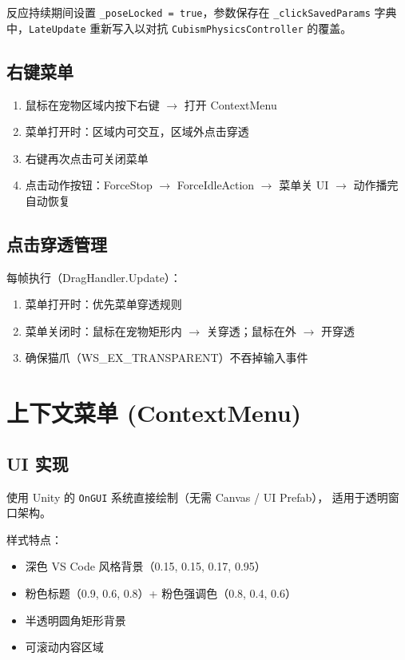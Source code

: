 \documentclass[12pt,a4paper]{ctexart}
\begin{document}
反应持续期间设置 \texttt{\_poseLocked = true}，参数保存在 \texttt{\_clickSavedParams} 字典中，\texttt{LateUpdate} 重新写入以对抗 \texttt{CubismPhysicsController} 的覆盖。

\subsection{右键菜单}

\begin{enumerate}
    \item 鼠标在宠物区域内按下右键 $\to$ 打开 ContextMenu
    \item 菜单打开时：区域内可交互，区域外点击穿透
    \item 右键再次点击可关闭菜单
    \item 点击动作按钮：ForceStop $\to$ ForceIdleAction $\to$ 菜单关 UI $\to$ 动作播完自动恢复
\end{enumerate}

\subsection{点击穿透管理}

每帧执行（DragHandler.Update）：
\begin{enumerate}
    \item 菜单打开时：优先菜单穿透规则
    \item 菜单关闭时：鼠标在宠物矩形内 $\to$ 关穿透；鼠标在外 $\to$ 开穿透
    \item 确保猫爪（WS\_EX\_TRANSPARENT）不吞掉输入事件
\end{enumerate}

\section{上下文菜单 (ContextMenu)}

\subsection{UI 实现}

使用 Unity 的 \texttt{OnGUI} 系统直接绘制（无需 Canvas / UI Prefab），
适用于透明窗口架构。

样式特点：
\begin{itemize}
    \item 深色 VS Code 风格背景（0.15, 0.15, 0.17, 0.95）
    \item 粉色标题（0.9, 0.6, 0.8）+ 粉色强调色（0.8, 0.4, 0.6）
    \item 半透明圆角矩形背景
    \item 可滚动内容区域
\end{itemize}
\end{document}
